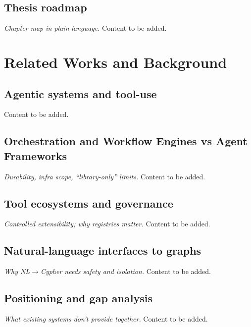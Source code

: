 \documentclass[a4paper,twoside]{sapthesis}
\begin{document}
\section{Thesis roadmap}
\label{sec:thesis-roadmap}
\emph{Chapter map in plain language.} Content to be added.


\chapter{Related Works and Background}
\label{ch:background}

\section{Agentic systems and tool-use}
\label{sec:agentic-systems}
Content to be added.

\section{Orchestration and Workflow Engines vs Agent Frameworks}
\label{sec:orchestration-frameworks}
\emph{Durability, infra scope, ``library-only'' limits.} Content to be added.

\section{Tool ecosystems and governance}
\label{sec:tool-ecosystems}
\emph{Controlled extensibility; why registries matter.} Content to be added.

\section{Natural-language interfaces to graphs}
\label{sec:nl-graphs}
\emph{Why NL$\to$Cypher needs safety and isolation.} Content to be added.

\section{Positioning and gap analysis}
\label{sec:gap-analysis}
\emph{What existing systems don't provide together.} Content to be added.

\end{document}
